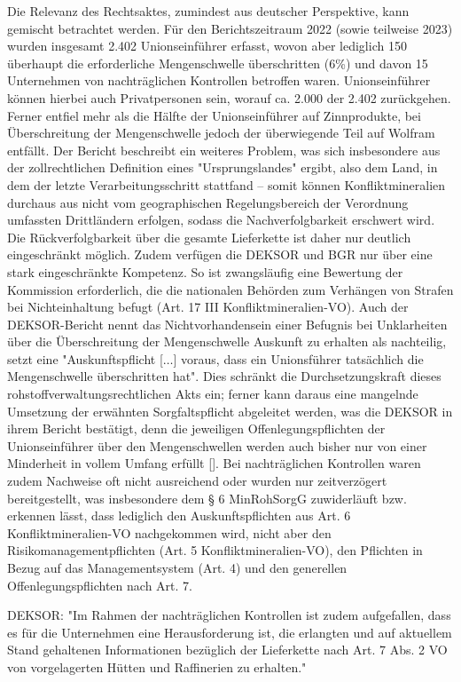 \documentclass[12pt,a4paper,oneside]{book} %
\begin{document}
	Die Relevanz des Rechtsaktes, zumindest aus deutscher Perspektive, kann gemischt betrachtet werden. Für den Berichtszeitraum 2022 \autocite{DEKSOR_Bericht_2023} (sowie teilweise 2023) wurden insgesamt 2.402 Unionseinführer erfasst, wovon aber lediglich 150 überhaupt die erforderliche Mengenschwelle überschritten (6\%) und davon 15 Unternehmen von nachträglichen Kontrollen betroffen waren. Unionseinführer können hierbei auch Privatpersonen sein, worauf ca. 2.000 der 2.402 zurückgehen. Ferner entfiel mehr als die Hälfte der Unionseinführer auf Zinnprodukte, bei Überschreitung der Mengenschwelle jedoch der überwiegende Teil auf Wolfram entfällt. Der Bericht beschreibt ein weiteres Problem, was sich insbesondere aus der zollrechtlichen Definition eines "Ursprungslandes" ergibt, also dem Land, in dem der letzte Verarbeitungsschritt stattfand – somit können Konfliktmineralien durchaus aus nicht vom geographischen Regelungsbereich der Verordnung umfassten Drittländern erfolgen, sodass die Nachverfolgbarkeit erschwert wird. Die Rückverfolgbarkeit über die gesamte Lieferkette ist daher nur deutlich eingeschränkt möglich.
	Zudem verfügen die DEKSOR und BGR nur über eine stark eingeschränkte Kompetenz. So ist zwangsläufig eine Bewertung der Kommission erforderlich, die die nationalen Behörden zum Verhängen von Strafen bei Nichteinhaltung befugt (Art. 17 III Konfliktmineralien-VO). Auch der DEKSOR-Bericht nennt das Nichtvorhandensein einer Befugnis bei Unklarheiten über die Überschreitung der Mengenschwelle Auskunft zu erhalten als nachteilig, setzt eine "Auskunftspflicht [$\ldots$] voraus, dass ein Unionsführer tatsächlich die Mengenschwelle überschritten hat". Dies schränkt die Durchsetzungskraft dieses rohstoffverwaltungsrechtlichen Akts ein; ferner kann daraus eine mangelnde Umsetzung der erwähnten Sorgfaltspflicht abgeleitet werden, was die DEKSOR in ihrem Bericht bestätigt, denn die jeweiligen Offenlegungspflichten der Unionseinführer über den Mengenschwellen werden auch bisher nur von einer Minderheit in vollem Umfang erfüllt \autocite[25]{DEKSOR}[]. Bei nachträglichen Kontrollen waren zudem Nachweise oft nicht ausreichend oder wurden nur zeitverzögert bereitgestellt, was insbesondere dem § 6 MinRohSorgG zuwiderläuft bzw. erkennen lässt, dass lediglich den Auskunftspflichten aus Art. 6 Konfliktmineralien-VO nachgekommen wird, nicht aber den Risikomanagementpflichten (Art. 5 Konfliktmineralien-VO), den Pflichten in Bezug auf das Managementsystem (Art. 4) und den generellen Offenlegungspflichten nach Art. 7.
	
	DEKSOR: "Im Rahmen der nachträglichen Kontrollen ist zudem aufgefallen,
	dass es für die Unternehmen eine Herausforderung ist, die erlangten und auf aktuellem Stand gehaltenen Informationen bezüglich der Lieferkette nach Art. 7 Abs. 2 VO von vorgelagerten Hütten und Raffinerien zu erhalten."
	
\end{document}
